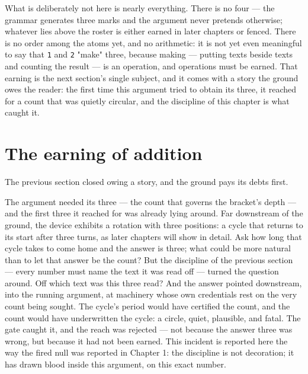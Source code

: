 What is deliberately not here is nearly everything. There is no four --- the grammar
generates three marks and the argument never pretends otherwise; whatever lies above
the roster is either earned in later chapters or fenced. There is no order among the
atoms yet, and no arithmetic: it is not yet even meaningful to say that \texttt{1} and
\texttt{2} "make" three, because making --- putting texts beside texts and counting
the result --- is an operation, and operations must be earned. That earning is the next
section's single subject, and it comes with a story the ground owes the reader: the
first time this argument tried to obtain its three, it reached for a count that was
quietly circular, and the discipline of this chapter is what caught it.

\section{The earning of addition}

The previous section closed owing a story, and the ground pays its debts first.

The argument needed its three --- the count that governs the bracket's depth --- and the
first three it reached for was already lying around. Far downstream of the ground, the
device exhibits a rotation with three positions: a cycle that returns to its start after
three turns, as later chapters will show in detail. Ask how long that cycle takes to
come home and the answer is three; what could be more natural than to let that answer be
the count? But the discipline of the previous section --- every number must name the
text it was read off --- turned the question around. Off which text was this three read?
And the answer pointed downstream, into the running argument, at machinery whose own
credentials rest on the very count being sought. The cycle's period would have certified
the count, and the count would have underwritten the cycle: a circle, quiet, plausible,
and fatal. The gate caught it, and the reach was rejected --- not because the answer
three was wrong, but because it had not been earned. This incident is reported here the
way the fired null was reported in Chapter 1: the discipline is not decoration; it has
drawn blood inside this argument, on this exact number.

